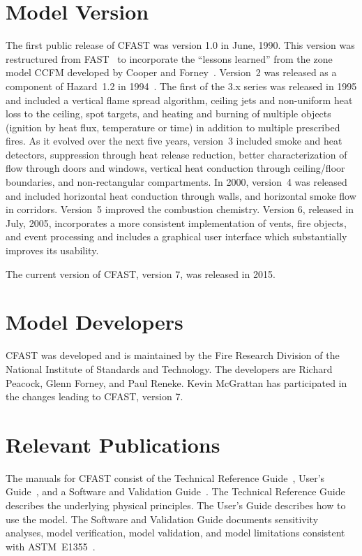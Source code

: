\documentclass[12pt]{book}
\begin{document}
\section{Model Version}

The first public release of CFAST was version 1.0 in June, 1990. This version was restructured from FAST~\cite{Models:FAST} to incorporate the ``lessons learned'' from the zone model CCFM developed by Cooper and Forney~\cite{Models:CCFM}. Version~2 was released as a component of Hazard~1.2 in 1994~\cite{Models:HAZARDI, Models:HAZARDI_12}. The first of the 3.x series was released in 1995 and included a vertical flame spread algorithm, ceiling jets and non-uniform heat loss to the ceiling, spot targets, and heating and burning of multiple objects (ignition by heat flux, temperature or time) in addition to multiple prescribed fires. As it evolved over the next five years, version~3 included smoke and heat detectors, suppression through heat release reduction, better characterization of flow through doors and windows, vertical heat conduction through ceiling/floor boundaries, and non-rectangular compartments. In 2000, version~4 was released and included horizontal heat conduction through walls, and horizontal smoke flow in corridors. Version~5 improved the combustion chemistry. Version 6, released in July, 2005, incorporates a more consistent implementation of vents, fire objects, and event processing and includes a graphical user interface which substantially improves its usability.

The current version of CFAST, version 7, was released in 2015.


\section{Model Developers}

CFAST was developed and is maintained by the Fire Research Division of the National Institute of Standards and Technology. The developers are Richard Peacock, Glenn Forney, and Paul Reneke. Kevin McGrattan has participated in the changes leading to CFAST, version 7.

\section{Relevant Publications}

The manuals for CFAST consist of the Technical Reference Guide~\cite{CFAST_Tech_Guide_7}, User's Guide~\cite{CFAST_Users_Guide_7}, and a Software and Validation Guide~\cite{CFAST_Valid_Guide_7}.  The Technical Reference Guide describes the underlying physical principles. The User's Guide describes how to use the model. The Software and Validation Guide documents sensitivity analyses, model verification, model validation, and model limitations consistent with ASTM~E1355~\cite{ASTM:E1355}.
\end{document}

